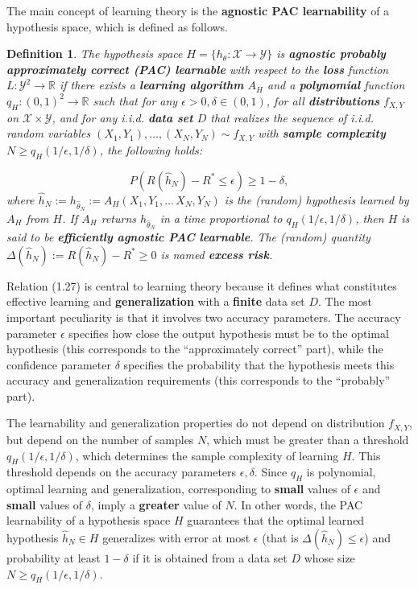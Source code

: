 \documentclass{report}
\newtheorem{definition}{Definition}[chapter]
\begin{document}
The main concept of learning theory is the \textbf{agnostic PAC learnability} of a hypothesis space, which is defined as follows.

\begin{definition}
The hypothesis space $H = \{h_\theta : \mathcal{X} \to \mathcal{Y}\}$ is \textbf{agnostic probably approximately correct (PAC) learnable} with respect to the \textbf{loss} function $L : \mathcal{Y}^2 \to \mathbb{R}$ if there exists a \textbf{learning algorithm} $A_H$ and a \textbf{polynomial} function $q_H : (0,1) ^2 \to \mathbb{R}$ such that for any $\epsilon > 0,\delta \in (0,1)$, for all \textbf{distributions} $f_{X,Y}$ on $\mathcal{X} \times \mathcal{Y}$, and for any i.i.d. \textbf{data set} $D$ that realizes the sequence of i.i.d. random variables $(X_1, Y_1),\dots,(X_N, Y_N)\sim f_{X,Y}$ with \textbf{sample complexity} $N\geq q_H(1/\epsilon,1/\delta)$, the following holds:

\begin{equation}
P(R(\hat{h}_N) - R^* \leq \epsilon) \geq 1- \delta,
\end{equation}
where $\hat{h}_N := h_{\hat{\theta}_N} := A_H(X_1, Y_1,\dots\,X_N, Y_N)$ is the (random) hypothesis learned by $A_H$ from $H$. If $A_H$ returns $h_{\hat{\theta}_N}$ in a time proportional to $q_H(1/\epsilon,1/\delta)$, then $H$ is said to be \textbf{efficiently agnostic PAC learnable}. The (random) quantity $\Delta(\hat{h}_N) := R(\hat{h}_N) - R^* \geq 0$ is named \textbf{excess risk}.
\end{definition}

Relation (1.27) is central to learning theory because it defines what constitutes effective learning and \textbf{generalization} with a \textbf{finite} data set $D$. The most important peculiarity is that it involves two accuracy parameters. The accuracy parameter $\epsilon$ specifies how close the output hypothesis must be to the optimal hypothesis (this corresponds to the “approximately correct” part), while the confidence parameter $\delta$ specifies the probability that the hypothesis meets this accuracy and generalization requirements (this corresponds to the “probably” part).

The learnability and generalization properties do not depend on distribution $f_{X,Y}$, but depend on the number of samples $N$, which must be greater than a threshold $q_H(1/\epsilon,1/\delta)$, which determines the sample complexity of learning $H$. This threshold depends on the accuracy parameters $\epsilon,\delta$. Since $q_H$ is polynomial, optimal learning and generalization, corresponding to \textbf{small} values of $\epsilon$ and \textbf{small} values of $\delta$, imply a \textbf{greater} value of $N$. In other words, the PAC learnability of a hypothesis space $H$ guarantees that the optimal learned hypothesis $\hat{h}_N \in H$ generalizes with error at most $\epsilon$ (that is $\Delta(\hat{h}_N) \leq \epsilon$) and probability at least $1-\delta$ if it is obtained from a data set $D$ whose size $N \geq q_H(1/\epsilon,1/\delta)$.
\end{document}
